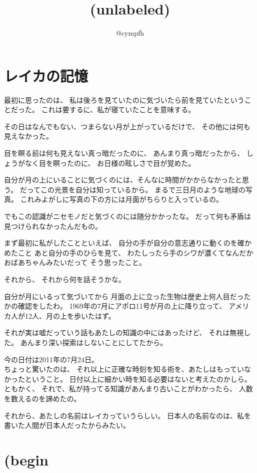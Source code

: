 \documentclass[]{book}
\title{(unlabeled)}
\author{@cympfh}
\date{}
\begin{document}
\maketitle

\section{レイカの記憶}

最初に思ったのは、
私は後ろを見ていたのに気づいたら前を見ていたということだった。
これは要するに、私が寝ていたことを意味する。

その日はなんでもない、つまらない月が上がっているだけで、
その他には何も見えなかった。

目を瞑る前は何も見えない真っ暗だったのに、 あんまり真っ暗だったから、
しょうがなく目を瞑ったのに、 お日様の眩しさで目が覚めた。

自分が月の上にいることに気づくのには、そんなに時間がかからなかったと思う。
だってこの光景を自分は知っているから。 まるで三日月のような地球の写真。
これみよがしに写真の下の方には月面がちらりと入っているの。

でもこの認識がニセモノだと気づくのには随分かかったな。
だって何も矛盾は見つけられなかったんだもの。

まず最初に私がしたことといえば、
自分の手が自分の意志通りに動くのを確かめたこと
あと自分の手のひらを見て、
わたしったら手のシワが濃くてなんだかおばあちゃんみたいだって
そう思ったこと。

それから、 それから何を話そうかな。

自分が月にいるって気づいてから
月面の上に立った生物は歴史上何人目だったかの確認をしたわ。
1969年の7月にアポロ11号が月の上に降り立って、
アメリカ人が12人、月の上を歩いたはず。

それが実は嘘だっていう話もあたしの知識の中にはあったけど、
それは無視した。 あんまり深い探索はしないことにしてたから。

今の日付は2011年の7月24日。\\ちょっと驚いたのは、
それ以上に正確な時刻を知る術を、あたしはもっていなかったということ。
日付以上に細かい時を知る必要はないと考えたのかしら。 ともかく、
それで、私が持ってる知識があんまり古いことがわかったら、
人数を数えるのを諦めたの。

それから、あたしの名前はレイカっていうらしい。
日本人の名前なのは、私を書いた人間が日本人だったからみたい。

\section{(begin}
\end{document}

